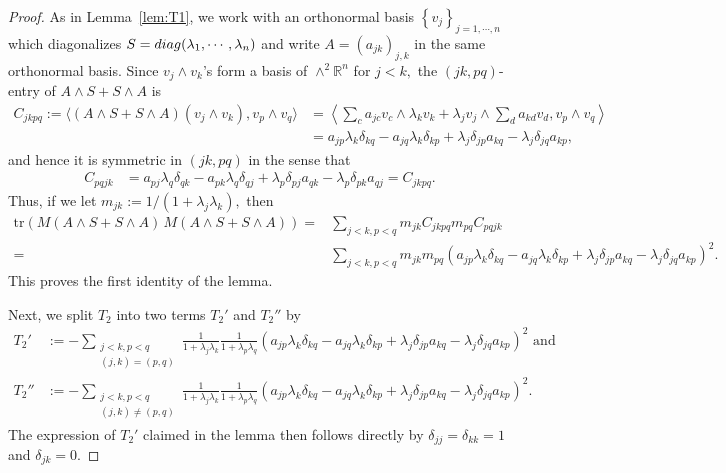 \documentclass[10pt,a4paper]{amsart}
\newcommand{\bb}[1]{\mathbb{#1}} \newcommand{\td}[1]{\widetilde{#1}}
\newcommand{\pair}[1]{\langle #1\rangle}
\newcommand{\ppair}[1]{\left\langle #1\right\rangle}
\newcommand{\pr}[1]{\left(#1\right)}
\newcommand{\set}[1]{\left\{#1\right\}}
\newcommand{\tr}{\text{tr}}
\begin{document}
\begin{proof}
	As in Lemma~\ref{lem:T1}, we work with an orthonormal basis $\set{v_j}_{j=1,\cdots,n}$ which diagonalizes $S={\rm diag}(\lambda_1,\cdots,\lambda_n)$ and write $A=(a_{jk})_{j,k}$ in the same orthonormal basis.
	Since $v_j\wedge v_k$'s form a basis of $\wedge^2\bb R^n$ for $j<k,$
	the $(jk,pq)$-entry of $A\wedge S+ S\wedge A$ is
	\begin{align*}
	C_{jkpq}
	:= \pair{(A\wedge S+ S\wedge A)(v_j\wedge v_k), v_p\wedge v_q}
	& = \ppair{
		\sum_c a_{jc}v_c\wedge \lambda_kv_k
		+ \lambda_jv_j\wedge \sum_d a_{kd}v_d,
		v_p\wedge v_q
	}\\
	& = a_{jp}\lambda_k\delta_{kq} - a_{jq}\lambda_k\delta_{kp}
	+ \lambda_j\delta_{jp}a_{kq}
	- \lambda_j\delta_{jq}a_{kp},
	\end{align*}
	and hence it is symmetric in $(jk,pq)$ in the sense that
	\begin{align*}
	C_{pqjk}
	& = a_{pj}\lambda_q\delta_{qk} - a_{pk}\lambda_q\delta_{qj}
	+ \lambda_p\delta_{pj}a_{qk}
	- \lambda_p\delta_{pk}a_{qj}
	= C_{jkpq}.
	\end{align*}
	Thus, if we let $m_{jk}:=1/(1+\lambda_j\lambda_k),$ then
	\begin{align*}
	\tr\pr{M (A \wedge S + S \wedge A) \, M (A \wedge S + S \wedge A) }
	= & \sum_{j<k, p<q}
	m_{jk} C_{jkpq} m_{pq} C_{pqjk}\\
	= & \sum_{j<k, p<q}
	m_{jk} m_{pq}
	\pr{a_{jp}\lambda_k\delta_{kq} - a_{jq}\lambda_k\delta_{kp}
		+ \lambda_j\delta_{jp}a_{kq}
		- \lambda_j\delta_{jq}a_{kp}}^2.
	\end{align*}
	This proves the first identity of the lemma.
	
	Next, we split $T_2$ into two terms $T_2'$ and $T_2''$ by
	\begin{align*}
	T_2'
	&:=- \sum_{\substack{j<k, p<q\\(j,k)= (p,q)}}
	\frac 1{1+\lambda_j\lambda_k}
	\frac 1{1+\lambda_p\lambda_q}
	\pr{a_{jp}\lambda_k\delta_{kq} - a_{jq}\lambda_k\delta_{kp}
		+ \lambda_j\delta_{jp}a_{kq}
		- \lambda_j\delta_{jq}a_{kp}}^2
	\text{ and}\\
	T_2''
	&:= -\sum_{\substack{j<k, p<q\\(j,k)\neq (p,q)}}
	\frac 1{1+\lambda_j\lambda_k}
	\frac 1{1+\lambda_p\lambda_q}
	\pr{a_{jp}\lambda_k\delta_{kq} - a_{jq}\lambda_k\delta_{kp}
		+ \lambda_j\delta_{jp}a_{kq}
		- \lambda_j\delta_{jq}a_{kp}}^2.
	\end{align*}
	The expression of $T_2'$ claimed in the lemma then follows directly by $\delta_{jj}=\delta_{kk}=1$ and $\delta_{jk}=0.$
	

\end{proof}
\end{document}
